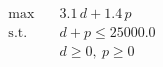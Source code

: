 \begin{align}
  \max \quad & 3.1\,d + 1.4\,p \\
  \text{s.t.} \quad & d + p \le 25000.0 \\
                     & d \ge 0,\ p \ge 0
\end{align}
